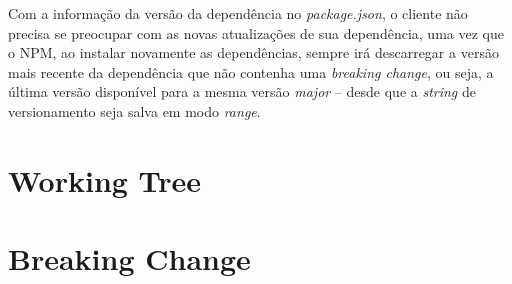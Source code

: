 Com a informação da versão da dependência no \textit{package.json}, o cliente não precisa se preocupar com as novas atualizações de sua dependência, uma vez que o \gls{NPM}, ao instalar novamente as dependências, sempre irá descarregar a versão mais recente da dependência que não contenha uma \textit{breaking change}, ou seja, a última versão disponível para a mesma versão \textit{major} -- desde que a \textit{string} de versionamento seja salva em modo \textit{range}.

\section{Working Tree}
\label{ref-teo:working_tree}

\section{Breaking Change}
\label{ref-teo:breaking_change}